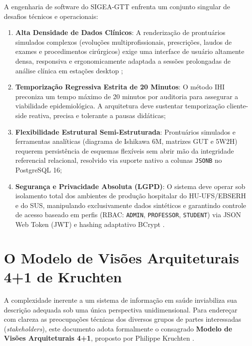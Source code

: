 A engenharia de software do SIGEA-GTT enfrenta um conjunto singular de desafios técnicos e operacionais:
\begin{enumerate}
    \item \textbf{Alta Densidade de Dados Clínicos}: A renderização de prontuários simulados complexos (evoluções multiprofissionais, prescrições, laudos de exames e procedimentos cirúrgicos) exige uma interface de usuário altamente densa, responsiva e ergonomicamente adaptada a sessões prolongadas de análise clínica em estações desktop \cite{patricio2021seguranca};
    \item \textbf{Temporização Regressiva Estrita de 20 Minutos}: O método IHI preconiza um tempo máximo de 20 minutos por auditoria para assegurar a viabilidade epidemiológica. A arquitetura deve sustentar temporização cliente-side reativa, precisa e tolerante a pausas didáticas;
    \item \textbf{Flexibilidade Estrutural Semi-Estruturada}: Prontuários simulados e ferramentas analíticas (diagrama de Ishikawa 6M, matrizes GUT e 5W2H) requerem persistência de esquemas flexíveis sem abrir mão da integridade referencial relacional, resolvido via suporte nativo a colunas \texttt{JSONB} no PostgreSQL 16;
    \item \textbf{Segurança e Privacidade Absoluta (LGPD)}: O sistema deve operar sob isolamento total dos ambientes de produção hospitalar do HU-UFS/EBSERH e do SUS, manipulando exclusivamente dados sintéticos e garantindo controle de acesso baseado em perfis (RBAC: \texttt{ADMIN}, \texttt{PROFESSOR}, \texttt{STUDENT}) via JSON Web Token (JWT) e hashing adaptativo BCrypt \cite{lgpd2018}.
\end{enumerate}

\section{O Modelo de Visões Arquiteturais 4+1 de Kruchten}
\label{sec_modelo_41}

A complexidade inerente a um sistema de informação em saúde inviabiliza sua descrição adequada sob uma única perspectiva unidimensional. Para endereçar com clareza as preocupações técnicas dos diversos grupos de partes interessadas (\textit{stakeholders}), este documento adota formalmente o consagrado \textbf{Modelo de Visões Arquiteturais 4+1}, proposto por Philippe Kruchten \cite{kruchten1995}.

